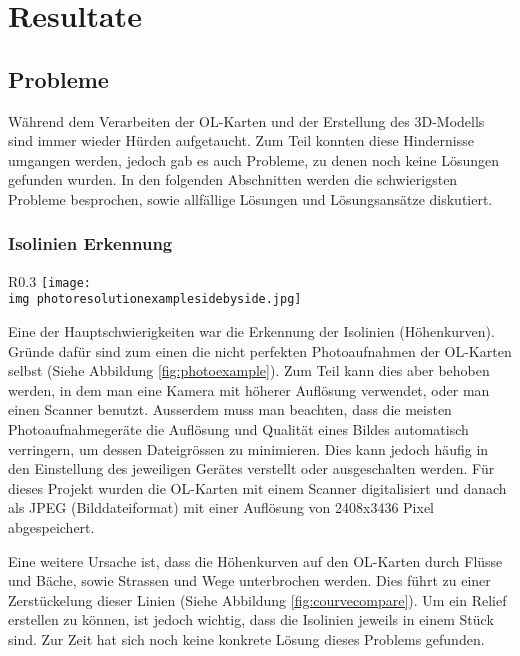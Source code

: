 \section{Resultate}

\subsection{Probleme}

Während dem Verarbeiten der OL-Karten und der Erstellung des 3D-Modells sind immer wieder Hürden aufgetaucht. Zum Teil konnten diese Hindernisse umgangen werden, jedoch gab es auch Probleme, zu denen noch keine Lösungen gefunden wurden. In den folgenden Abschnitten werden die schwierigsten Probleme besprochen, sowie allfällige Lösungen und Lösungsansätze diskutiert.

\subsubsection{Isolinien Erkennung}

\begin{wrapfigure}[17]{R}{0.3\textwidth}
	\centering
	\texttt{[image: \\img photoresolutionexamplesidebyside.jpg]}
	\caption{Photoaufnahme Auflösung Vergleich, oben: 50x50, unten 200x200}
	\label{fig:photoexample}
\end{wrapfigure}

Eine der Hauptschwierigkeiten war die Erkennung der Isolinien (Höhenkurven). Gründe dafür sind zum einen die nicht perfekten Photoaufnahmen der OL-Karten selbst (Siehe Abbildung \ref{fig:photoexample}). Zum Teil kann dies aber behoben werden, in dem man eine Kamera mit höherer Auflösung verwendet, oder man einen Scanner benutzt. Ausserdem muss man beachten, dass die meisten Photoaufnahmegeräte die Auflösung und Qualität eines Bildes automatisch verringern, um dessen Dateigrössen zu minimieren. Dies kann jedoch häufig in den Einstellung des jeweiligen Gerätes verstellt oder ausgeschalten werden. Für dieses Projekt wurden die OL-Karten mit einem Scanner digitalisiert und danach als JPEG (Bilddateiformat) mit einer Auflösung von 2408x3436 Pixel abgespeichert. 



Eine weitere Ursache ist, dass die Höhenkurven auf den OL-Karten durch Flüsse und Bäche, sowie Strassen und Wege unterbrochen werden. Dies führt zu einer Zerstückelung dieser Linien (Siehe Abbildung \ref{fig:courvecompare}). Um ein Relief erstellen zu können, ist jedoch wichtig, dass die Isolinien jeweils in einem Stück sind. Zur Zeit hat sich noch keine konkrete Lösung dieses Problems gefunden. 

